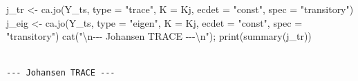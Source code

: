 \documentclass[
  spanish,
  letterpaper,
  DIV=11,
  numbers=noendperiod]{scrartcl}
\newenvironment{Shaded}{\begin{snugshade}}{\end{snugshade}}
\newcommand{\AttributeTok}[1]{\textcolor[rgb]{0.40,0.45,0.13}{#1}}
\newcommand{\FunctionTok}[1]{\textcolor[rgb]{0.28,0.35,0.67}{#1}}
\newcommand{\NormalTok}[1]{\textcolor[rgb]{0.00,0.23,0.31}{#1}}
\newcommand{\OtherTok}[1]{\textcolor[rgb]{0.00,0.23,0.31}{#1}}
\newcommand{\SpecialCharTok}[1]{\textcolor[rgb]{0.37,0.37,0.37}{#1}}
\newcommand{\StringTok}[1]{\textcolor[rgb]{0.13,0.47,0.30}{#1}}
\begin{document}
\begin{Shaded}
\begin{Highlighting}[]
\NormalTok{j\_tr  }\OtherTok{\textless{}{-}} \FunctionTok{ca.jo}\NormalTok{(Y\_ts, }\AttributeTok{type =} \StringTok{"trace"}\NormalTok{, }\AttributeTok{K =}\NormalTok{ Kj, }\AttributeTok{ecdet =} \StringTok{"const"}\NormalTok{, }\AttributeTok{spec =} \StringTok{"transitory"}\NormalTok{)}
\NormalTok{j\_eig }\OtherTok{\textless{}{-}} \FunctionTok{ca.jo}\NormalTok{(Y\_ts, }\AttributeTok{type =} \StringTok{"eigen"}\NormalTok{, }\AttributeTok{K =}\NormalTok{ Kj, }\AttributeTok{ecdet =} \StringTok{"const"}\NormalTok{, }\AttributeTok{spec =} \StringTok{"transitory"}\NormalTok{)}
\FunctionTok{cat}\NormalTok{(}\StringTok{"}\SpecialCharTok{\textbackslash{}n}\StringTok{{-}{-}{-} Johansen TRACE {-}{-}{-}}\SpecialCharTok{\textbackslash{}n}\StringTok{"}\NormalTok{); }\FunctionTok{print}\NormalTok{(}\FunctionTok{summary}\NormalTok{(j\_tr))}
\end{Highlighting}
\end{Shaded}

\begin{verbatim}

--- Johansen TRACE ---
\end{verbatim}
\end{document}
